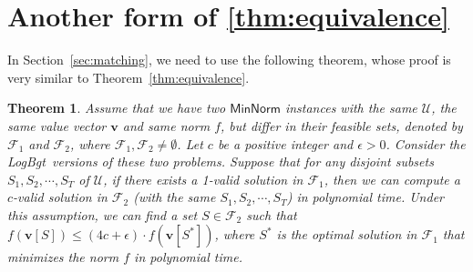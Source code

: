 \documentclass[11pt,a4paper]{article} \usepackage{enumitem}
\newcommand{\calF}{\mathcal{F}}
\newcommand{\calU}{\mathcal{U}}
\newcommand{\boldv}{\boldsymbol{v}}
\newcommand{\minnorm}{\textsf{MinNorm}}
\newcommand{\LBO}{\textsf{LogBgt}}
\newtheorem{theorem}{Theorem}[section]
\theoremstyle{definition}
\begin{document}
\section{Another form of \cref{thm:equivalence}}
\label{sec4:proof}
In Section~\ref{sec:matching}, we need to use the following theorem, whose proof is very similar to Theorem~\ref{thm:equivalence}.

\begin{theorem}
\label{thm:diffequiv}
Assume that we have two $\minnorm$ instances with the same $\calU$, the same value vector $\boldv$ and same norm $f$, but differ in their feasible sets, denoted by $\calF_1$ and $\calF_2$, where $\calF_1,\calF_2\neq \emptyset$.
Let $c$ be a positive integer and $\epsilon>0$. 
Consider the \LBO\ versions of these two problems.
Suppose that for any disjoint subsets $S_1,S_2,\cdots,S_T$ of $\calU$, if there exists a 1-valid solution in $\calF_1$, then we can compute a $c$-valid solution in $\calF_2$
(with the same $S_1,S_2,\cdots,S_T$) in polynomial time.
Under this assumption, we can find a set $S\in\calF_2$ such that $f(\boldv[S])\leq (4c+\epsilon)\cdot f(\boldv[S^*])$, where $S^*$ is the optimal solution in $\calF_1$ that minimizes the norm $f$ in polynomial time.
\end{theorem}
\end{document}
